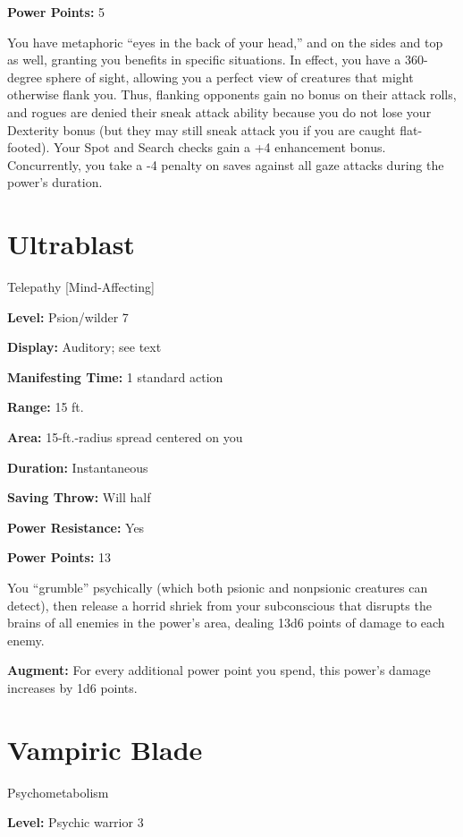 \documentclass{article}
\begin{document}
\textbf{Power Points:} 5

You have metaphoric ``eyes in the back of your head,'' and on the sides and top 
as well, granting you benefits in specific situations. In effect, you have a 360-degree 
sphere of sight, allowing you a perfect view of creatures that might otherwise 
flank you. Thus, flanking opponents gain no bonus on their attack rolls, and rogues 
are denied their sneak attack ability because you do not lose your Dexterity bonus 
(but they may still sneak attack you if you are caught flat-footed). Your Spot 
and Search checks gain a +4 enhancement bonus. Concurrently, you take a -4 penalty 
on saves against all gaze attacks during the power's duration.

\vspace{12pt}
\section*{Ultrablast}

Telepathy [Mind-Affecting]

\textbf{Level:} Psion/wilder 7

\textbf{Display:} Auditory; see text

\textbf{Manifesting Time:} 1 standard action

\textbf{Range:} 15 ft.

\textbf{Area:} 15-ft.-radius spread centered on you

\textbf{Duration:} Instantaneous

\textbf{Saving Throw:} Will half

\textbf{Power Resistance:} Yes

\textbf{Power Points:} 13

You ``grumble'' psychically (which both psionic and nonpsionic creatures can detect), 
then release a horrid shriek from your subconscious that disrupts the brains of 
all enemies in the power's area, dealing 13d6 points of damage to each enemy.

\textbf{Augment:} For every additional power point you spend, this power's damage 
increases by 1d6 points. 

\vspace{12pt}
\section*{Vampiric Blade}

Psychometabolism

\textbf{Level:} Psychic warrior 3
\end{document}
